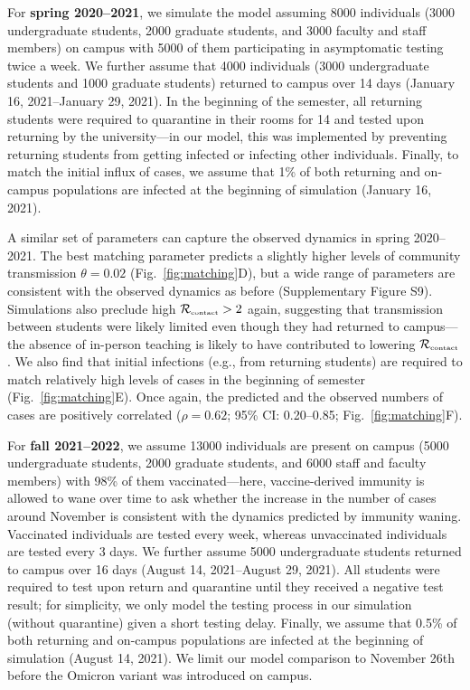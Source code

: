 \documentclass[12pt]{article}
\newcommand{\fref}[1]{Fig.~\ref{fig:#1}}
\newcommand{\Rx}[1]{\ensuremath{{\mathcal R}_{#1}}}
\newcommand{\Rc}{\Rx{\textrm{\tiny{contact}}}}
\begin{document}
For \textbf{spring 2020--2021}, we simulate the model assuming 8000 individuals (3000 undergraduate students, 2000 graduate students, and 3000 faculty and staff members) on campus with 5000 of them participating in asymptomatic testing twice a week.
We further assume that 4000 individuals (3000 undergraduate students and 1000 graduate students) returned to campus over 14 days (January 16, 2021--January 29, 2021).
In the beginning of the semester, all returning students were required to quarantine in their rooms for 14 and tested upon returning by the university---in our model, this was implemented by preventing returning students from getting infected or infecting other individuals.
Finally, to match the initial influx of cases, we assume that 1\% of both returning and on-campus populations are infected at the beginning of simulation (January 16, 2021).

A similar set of parameters can capture the observed dynamics in spring 2020--2021.
The best matching parameter predicts a slightly higher levels of community transmission $\theta=0.02$ (\fref{matching}D), but a wide range of parameters are consistent with the observed dynamics as before (Supplementary Figure S9). 
Simulations also preclude high $\Rc > 2$ again, suggesting that transmission between students were likely limited even though they had returned to campus---the absence of in-person teaching is likely to have contributed to lowering $\Rc$.
We also find that initial infections (e.g., from returning students) are required to match relatively high levels of cases in the beginning of semester (\fref{matching}E). 
Once again, the predicted and the observed numbers of cases are positively correlated ($\rho = 0.62$; 95\% CI: 0.20--0.85; \fref{matching}F).

For \textbf{fall 2021--2022}, we assume 13000 individuals are present on campus (5000 undergraduate students, 2000 graduate students, and 6000 staff and faculty members) with 98\% of them vaccinated---here, vaccine-derived immunity is allowed to wane over time to ask whether the increase in the number of cases around November is consistent with the dynamics predicted by immunity waning.
Vaccinated individuals are tested every week, whereas unvaccinated individuals are tested every 3 days. 
We further assume 5000 undergraduate students returned to campus over 16 days (August 14, 2021--August 29, 2021).
All students were required to test upon return and quarantine until they received a negative test result;
for simplicity, we only model the testing process in our simulation (without quarantine) given a short testing delay.
Finally, we assume that 0.5\% of both returning and on-campus populations are infected at the beginning of simulation (August 14, 2021).
We limit our model comparison to November 26th before the Omicron variant was introduced on campus.
\end{document}
